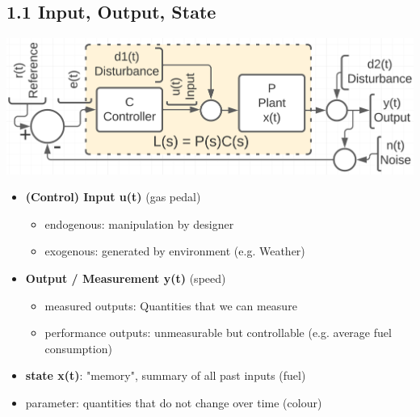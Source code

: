 \subsection{1.1 Input, Output, State}
    \includegraphics[width = \linewidth]{src/images/basic_block_chart.png}
    \begin{itemize}
        \item \textbf{(Control) Input u(t)} (gas pedal)
        \begin{itemize}
            \item endogenous: manipulation by designer
            \item exogenous: generated by environment (e.g. Weather)
        \end{itemize}
        \item \textbf{Output / Measurement y(t)} (speed)
        \begin{itemize}
            \item measured outputs: Quantities that we can measure
            \item performance outputs: unmeasurable but controllable (e.g. average fuel consumption)
        \end{itemize}
        \item \textbf{state x(t)}: "memory", summary of all past inputs (fuel)
        \item parameter: quantities that do not change over time (colour)
\end{itemize}